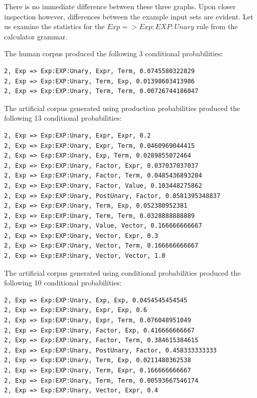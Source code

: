 There is no immediate difference between these three graphs. Upon closer
inspection however, differences between the example input sets are evident. Let
us examine the statistics for the $Exp => Exp:EXP:Unary$ rule from the
calculator grammar.

The human corpus produced the following 3 conditional probabilities: \\

\noindent
\begin{verbatim}
2, Exp => Exp:EXP:Unary, Expr, Term, 0.0745580322829
2, Exp => Exp:EXP:Unary, Term, Exp, 0.01398603413986
2, Exp => Exp:EXP:Unary, Term, Term, 0.00726744186047
\end{verbatim}


The artificial corpus generated using production probabilities produced the
following 13 conditional probabilities: \\

\noindent
\begin{verbatim}
2, Exp => Exp:EXP:Unary, Expr, Expr, 0.2
2, Exp => Exp:EXP:Unary, Expr, Term, 0.0460969044415
2, Exp => Exp:EXP:Unary, Exp, Term, 0.0289855072464
2, Exp => Exp:EXP:Unary, Factor, Expr, 0.037037037037
2, Exp => Exp:EXP:Unary, Factor, Term, 0.0485436893204
2, Exp => Exp:EXP:Unary, Factor, Value, 0.103448275862
2, Exp => Exp:EXP:Unary, PostUnary, Factor, 0.0581395348837
2, Exp => Exp:EXP:Unary, Term, Exp, 0.052380952381
2, Exp => Exp:EXP:Unary, Term, Term, 0.0328888888889
2, Exp => Exp:EXP:Unary, Value, Vector, 0.166666666667
2, Exp => Exp:EXP:Unary, Vector, Expr, 0.3
2, Exp => Exp:EXP:Unary, Vector, Term, 0.166666666667
2, Exp => Exp:EXP:Unary, Vector, Vector, 1.0
\end{verbatim}

The artificial corpus generated using conditional probabilities produced the
following 10 conditional probabilities: \\

\noindent
\begin{verbatim}
2, Exp => Exp:EXP:Unary, Exp, Exp, 0.0454545454545
2, Exp => Exp:EXP:Unary, Expr, Exp, 0.6
2, Exp => Exp:EXP:Unary, Expr, Term, 0.076048951049
2, Exp => Exp:EXP:Unary, Factor, Exp, 0.416666666667
2, Exp => Exp:EXP:Unary, Factor, Term, 0.384615384615
2, Exp => Exp:EXP:Unary, PostUnary, Factor, 0.458333333333
2, Exp => Exp:EXP:Unary, Term, Exp, 0.0211480362538
2, Exp => Exp:EXP:Unary, Term, Expr, 0.166666666667
2, Exp => Exp:EXP:Unary, Term, Term, 0.00593667546174
2, Exp => Exp:EXP:Unary, Vector, Expr, 0.4
\end{verbatim}

